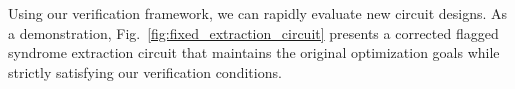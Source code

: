 \documentclass[acmsmallw,review]{acmart}
\begin{document}
Using our verification framework, we can rapidly evaluate new circuit designs. As a demonstration, Fig.~\ref{fig:fixed_extraction_circuit} presents a corrected flagged syndrome extraction circuit that maintains the original optimization goals while strictly satisfying our verification conditions.





\begin{figure}[h]
\centering

\begin{subfigure}{0.2\linewidth} 
\hspace*{-5.5cm}
\centering
{}
\end{subfigure}
\end{figure}
\end{document}
